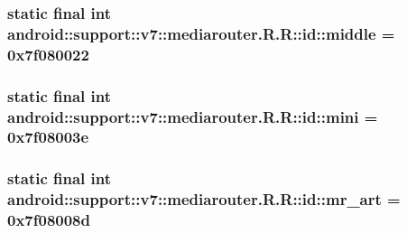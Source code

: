 \hypertarget{classandroid_1_1support_1_1v7_1_1mediarouter_1_1_r_1_1id_fd74b0ca59000e82bd492fd01cca7c75}{
\subsubsection[{middle}]{\setlength{\rightskip}{0pt plus 5cm}static final int android::support::v7::mediarouter.R.R::id::middle = 0x7f080022}}
\label{classandroid_1_1support_1_1v7_1_1mediarouter_1_1_r_1_1id_fd74b0ca59000e82bd492fd01cca7c75}


\hypertarget{classandroid_1_1support_1_1v7_1_1mediarouter_1_1_r_1_1id_0f5de0a2f79024abf9f15096c7403d57}{
\subsubsection[{mini}]{\setlength{\rightskip}{0pt plus 5cm}static final int android::support::v7::mediarouter.R.R::id::mini = 0x7f08003e}}
\label{classandroid_1_1support_1_1v7_1_1mediarouter_1_1_r_1_1id_0f5de0a2f79024abf9f15096c7403d57}


\hypertarget{classandroid_1_1support_1_1v7_1_1mediarouter_1_1_r_1_1id_f0bc78cfdad76b108e8d813fa0d1b371}{
\subsubsection[{mr\_\-art}]{\setlength{\rightskip}{0pt plus 5cm}static final int android::support::v7::mediarouter.R.R::id::mr\_\-art = 0x7f08008d}}
\label{classandroid_1_1support_1_1v7_1_1mediarouter_1_1_r_1_1id_f0bc78cfdad76b108e8d813fa0d1b371}


